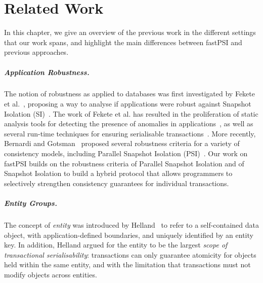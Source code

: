 \cleardoublepage
\chapter{Related Work}
\label{chapter:related_work}

In this chapter, we give an overview of the previous work in the different settings that our work spans, and highlight the main differences between fastPSI and previous approaches.


\paragraph{Application Robustness.} The notion of robustness as applied to databases was first investigated by Fekete et al.~\citep{fekete_ssi}, proposing a way to analyse if applications were robust against Snapshot Isolation (SI)~\citep{sql-critique}. The work of Fekete et al. has resulted in the proliferation of static analysis tools for detecting the presence of anomalies in applications~\citep{sudhir_static}, as well as several run-time techniques for ensuring serialisable transactions~\citep{ports_postgres}. More recently, Bernardi and Gotsman~\citep{concur_robustness} proposed several robustness criteria for a variety of consistency models, including Parallel Snapshot Isolation (PSI)~\citep{psi-intro}. Our work on fastPSI builds on the robustness criteria of Parallel Snapshot Isolation and of Snapshot Isolation to build a hybrid protocol that allows programmers to selectively strengthen consistency guarantees for individual transactions.


\paragraph{Entity Groups.} The concept of \emph{entity} was introduced by Helland~\citep{helland_entity} to refer to a self-contained data object, with application-defined boundaries, and uniquely identified by an entity key. In addition, Helland argued for the entity to be the largest \emph{scope of transactional serialisability}: transactions can only guarantee atomicity for objects held within the same entity, and with the limitation that transactions must not modify objects across entities.

